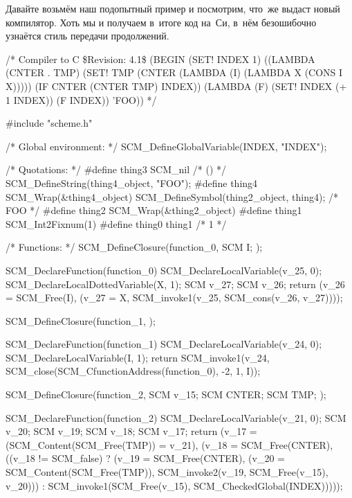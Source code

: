 Давайте возьмём наш подопытный пример и посмотрим, что~же выдаст новый
компилятор. Хоть мы и получаем в~итоге код на~Си, в~нём безошибочно узнаётся
стиль передачи продолжений.

\begin{code:c-frame}[title={\snippet{o/chap10kex.c}}, numbers=left,
    label=cc/call/cc/cc/example/src:subj]
/* Compiler to C \$Revision: 4.1\$
(BEGIN
  (SET! INDEX 1)
  ((LAMBDA
     (CNTER . TMP)
     (SET! TMP (CNTER (LAMBDA (I) (LAMBDA X (CONS I X)))))
     (IF CNTER (CNTER TMP) INDEX))
    (LAMBDA (F) (SET! INDEX (+ 1 INDEX)) (F INDEX))
    'FOO))
*/

#include "scheme.h"

/* Global environment: */
SCM_DefineGlobalVariable(INDEX, "INDEX");

/* Quotations: */
#define thing3 SCM_nil                      /* () */
SCM_DefineString(thing4_object, "FOO");
#define thing4 SCM_Wrap(&thing4_object)
SCM_DefineSymbol(thing2_object, thing4);    /* FOO */
#define thing2 SCM_Wrap(&thing2_object)
#define thing1 SCM_Int2Fixnum(1)
#define thing0 thing1                       /* 1 */

/* Functions: */
SCM_DefineClosure(function_0, SCM I; );

SCM_DeclareFunction(function_0)
{
    SCM_DeclareLocalVariable(v_25, 0);
    SCM_DeclareLocalDottedVariable(X, 1);
    SCM v_27; SCM v_26;
    return (v_26 = SCM_Free(I),
            (v_27 = X,
             SCM_invoke1(v_25,
                         SCM_cons(v_26, v_27))));
}

SCM_DefineClosure(function_1, );

SCM_DeclareFunction(function_1)
{
    SCM_DeclareLocalVariable(v_24, 0);
    SCM_DeclareLocalVariable(I, 1);
    return SCM_invoke1(v_24,
                       SCM_close(SCM_CfunctionAddress(function_0),
                                 -2, 1, I));
}

SCM_DefineClosure(function_2, SCM v_15; SCM CNTER; SCM TMP; );

SCM_DeclareFunction(function_2)
{
    SCM_DeclareLocalVariable(v_21, 0);
    SCM v_20; SCM v_19; SCM v_18; SCM v_17;
    return (v_17 = (SCM_Content(SCM_Free(TMP)) = v_21),
            (v_18 = SCM_Free(CNTER),
             ((v_18 != SCM_false)
              ? (v_19 = SCM_Free(CNTER),
                 (v_20 = SCM_Content(SCM_Free(TMP)),
                  SCM_invoke2(v_19,
                              SCM_Free(v_15),
                              v_20)))
              : SCM_invoke1(SCM_Free(v_15),
                            SCM_CheckedGlobal(INDEX)))));
}


\end{code:c-frame}

